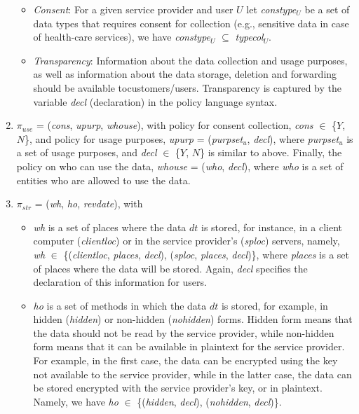 \documentclass[a4paper]{article}
\begin{document}
\begin{enumerate}
\begin{itemize}
\item \textit{Consent}:  For a given service provider and user $U$ let \textit{constype}$_U$ be a set of data types that requires consent for collection (e.g., sensitive data in case of health-care services), we have \textit{constype}$_U$ $\subseteq$ \textit{typecol}$_U$. 

\item \textit{Transparency}: Information about the data collection and usage purposes, as well as information about the data storage, deletion and forwarding should be available tocustomers/users. Transparency is captured by the variable \textit{decl} (declaration) in the policy language syntax. 

\end{itemize}  

\item $\pi_{use}$ = (\textit{cons}, \textit{upurp}, \textit{whouse}), with  policy for consent collection, \textit{cons} $\in$ \{$Y$, $N$\}, and policy for usage purposes,  \textit{upurp} = (\textit{purpset}$_u$, \textit{decl}), where \textit{purpset}$_u$ is a set of usage purposes, and \textit{decl} $\in$ \{$Y$, $N$\} is similar to above. Finally, the policy on who can use the data,  \textit{whouse} = (\textit{who}, \textit{decl}), where \textit{who} is a set of entities who are allowed to use the data.  

\item $\pi_{str}$ = (\textit{wh},  \textit{ho},  \textit{revdate}), with 
\begin{itemize}
\item \textit{wh} is a set of places where the data $dt$ is stored, for instance, in a client computer (\textit{clientloc}) or in the service provider's (\textit{sploc}) 
servers, namely, \textit{wh} $\in$ \{(\textit{clientloc}, \textit{places}, \textit{decl}), (\textit{sploc}, \textit{places}, \textit{decl})\}, where \textit{places} is a set of places where the data will be stored.  Again, \textit{decl} specifies the declaration of this information for users.     

\item \textit{ho} is a set of methods in which the data $dt$ is stored, 
for example, in hidden (\textit{hidden}) or non-hidden (\textit{nohidden}) forms. Hidden form means that the data should not be read by the service provider, while non-hidden form means that it can be available in plaintext for the service provider.  For example, in the first case, the data can be encrypted using the key not available to the service provider, while in the latter case, the data can be stored encrypted with the service provider's key, or in plaintext. Namely, we have \textit{ho} $\in$ \{(\textit{hidden}, \textit{decl}), (\textit{nohidden}, \textit{decl})\}.


\end{itemize}
\end{enumerate}
\end{document}
